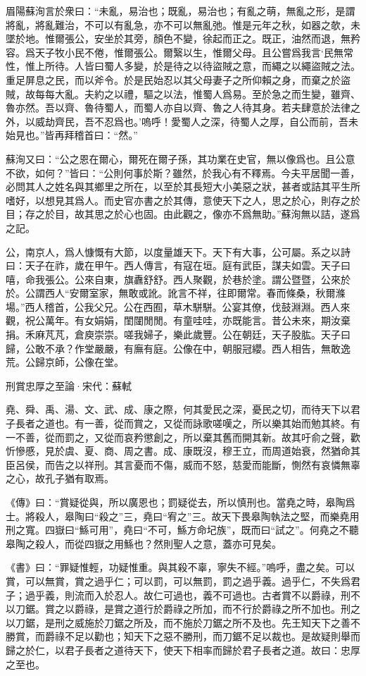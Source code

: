\documentclass[12pt,a4paper]{ctexbook}
\begin{document}
眉陽蘇洵言於衆曰：“未亂，易治也；既亂，易治也；有亂之萌，無亂之形，是謂將亂，將亂難治，不可以有亂急，亦不可以無亂弛。惟是元年之秋，如器之欹，未墜於地。惟爾張公，安坐於其旁，顏色不變，徐起而正之。既正，油然而退，無矜容。爲天子牧小民不倦，惟爾張公。爾繄以生，惟爾父母。且公嘗爲我言‘民無常性，惟上所待。人皆曰蜀人多變，於是待之以待盜賊之意，而繩之以繩盜賊之法。重足屏息之民，而以斧令。於是民始忍以其父母妻子之所仰賴之身，而棄之於盜賊，故每每大亂。夫約之以禮，驅之以法，惟蜀人爲易。至於急之而生變，雖齊、魯亦然。吾以齊、魯待蜀人，而蜀人亦自以齊、魯之人待其身。若夫肆意於法律之外，以威劫齊民，吾不忍爲也。’嗚呼！愛蜀人之深，待蜀人之厚，自公而前，吾未始見也。”皆再拜稽首曰：“然。”\par
蘇洵又曰：“公之恩在爾心，爾死在爾子孫，其功業在史官，無以像爲也。且公意不欲，如何？”皆曰：“公則何事於斯？雖然，於我心有不釋焉。今夫平居聞一善，必問其人之姓名與其鄉里之所在，以至於其長短大小美惡之狀，甚者或詰其平生所嗜好，以想見其爲人。而史官亦書之於其傳，意使天下之人，思之於心，則存之於目；存之於目，故其思之於心也固。由此觀之，像亦不爲無助。”蘇洵無以詰，遂爲之記。\par
公，南京人，爲人慷慨有大節，以度量雄天下。天下有大事，公可屬。系之以詩曰：天子在祚，歲在甲午。西人傳言，有寇在垣。庭有武臣，謀夫如雲。天子曰嘻，命我張公。公來自東，旗纛舒舒。西人聚觀，於巷於塗。謂公暨暨，公來於於。公謂西人“安爾室家，無敢或訛。訛言不祥，往即爾常。春而條桑，秋爾滌場。”西人稽首，公我父兄。公在西囿，草木駢駢。公宴其僚，伐鼓淵淵。西人來觀，祝公萬年。有女娟娟，閨闥閒閒。有童哇哇，亦既能言。昔公未來，期汝棄捐。禾麻芃芃，倉庾崇崇。嗟我婦子，樂此歲豐。公在朝廷，天子股肱。天子曰歸，公敢不承？作堂嚴嚴，有廡有庭。公像在中，朝服冠纓。西人相告，無敢逸荒。公歸京師，公像在堂。\par
刑賞忠厚之至論·宋代：蘇軾 \par
堯、舜、禹、湯、文、武、成、康之際，何其愛民之深，憂民之切，而待天下以君子長者之道也。有一善，從而賞之，又從而詠歌嗟嘆之，所以樂其始而勉其終。有一不善，從而罰之，又從而哀矜懲創之，所以棄其舊而開其新。故其吁俞之聲，歡忻慘慼，見於虞、夏、商、周之書。成、康既沒，穆王立，而周道始衰，然猶命其臣呂侯，而告之以祥刑。其言憂而不傷，威而不怒，慈愛而能斷，惻然有哀憐無辜之心，故孔子猶有取焉。\par
《傳》曰：“賞疑從與，所以廣恩也；罰疑從去，所以慎刑也。當堯之時，皋陶爲士。將殺人，皋陶曰“殺之”三，堯曰“宥之”三。故天下畏皋陶執法之堅，而樂堯用刑之寬。四嶽曰“鯀可用”，堯曰“不可，鯀方命圮族”，既而曰“試之”。何堯之不聽皋陶之殺人，而從四嶽之用鯀也？然則聖人之意，蓋亦可見矣。\par
《書》曰：“罪疑惟輕，功疑惟重。與其殺不辜，寧失不經。”嗚呼，盡之矣。可以賞，可以無賞，賞之過乎仁；可以罰，可以無罰，罰之過乎義。過乎仁，不失爲君子；過乎義，則流而入於忍人。故仁可過也，義不可過也。古者賞不以爵祿，刑不以刀鋸。賞之以爵祿，是賞之道行於爵祿之所加，而不行於爵祿之所不加也。刑之以刀鋸，是刑之威施於刀鋸之所及，而不施於刀鋸之所不及也。先王知天下之善不勝賞，而爵祿不足以勸也；知天下之惡不勝刑，而刀鋸不足以裁也。是故疑則舉而歸之於仁，以君子長者之道待天下，使天下相率而歸於君子長者之道。故曰：忠厚之至也。\par
\end{document}
